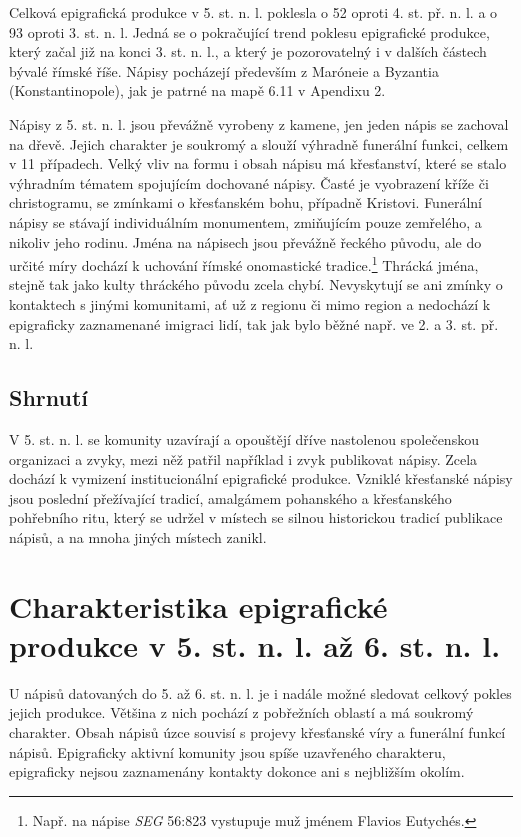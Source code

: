 \NC\AR
\HL
\HL
\stoptable

Celková epigrafická produkce v 5. st. n. l. poklesla o 52  oproti 4. st. př. n. l. a o 93  oproti 3. st. n. l. Jedná se o pokračující trend poklesu epigrafické produkce, který začal již na konci 3. st. n. l., a který je pozorovatelný i v dalších částech bývalé římské říše. Nápisy pocházejí především z Maróneie a Byzantia (Konstantinopole), jak je patrné na mapě 6.11 v Apendixu 2.

Nápisy z 5. st. n. l. jsou převážně vyrobeny z kamene, jen jeden nápis se zachoval na dřevě. Jejich charakter je soukromý a slouží výhradně funerální funkci, celkem v 11 případech. Velký vliv na formu i obsah nápisu má křesťanství, které se stalo výhradním tématem spojujícím dochované nápisy. Časté je vyobrazení kříže či christogramu, se zmínkami o křesťanském bohu, případně Kristovi. Funerální nápisy se stávají individuálním monumentem, zmiňujícím pouze zemřelého, a nikoliv jeho rodinu. Jména na nápisech jsou převážně řeckého původu, ale do určité míry dochází k uchování římské onomastické tradice.\footnote{Např. na nápise {\em SEG} 56:823 vystupuje muž jménem Flavios Eutychés.} Thrácká jména, stejně tak jako kulty thráckého původu zcela chybí. Nevyskytují se ani zmínky o kontaktech s jinými komunitami, ať už z regionu či mimo region a nedochází k epigraficky zaznamenané imigraci lidí, tak jak bylo běžné např. ve 2. a 3. st. př. n. l.

\subsection[shrnutí-23]{Shrnutí}

V 5. st. n. l. se komunity uzavírají a opouštějí dříve nastolenou společenskou organizaci a zvyky, mezi něž patřil například i zvyk publikovat nápisy. Zcela dochází k vymizení institucionální epigrafické produkce. Vzniklé křesťanské nápisy jsou poslední přežívající tradicí, amalgámem pohanského a křesťanského pohřebního ritu, který se udržel v místech se silnou historickou tradicí publikace nápisů, a na mnoha jiných místech zanikl.

\section[charakteristika-epigrafické-produkce-v-5.-st.-n.-l.-až-6.-st.-n.-l.]{Charakteristika epigrafické produkce v 5. st. n. l. až 6. st. n. l.}

U nápisů datovaných do 5. až 6. st. n. l. je i nadále možné sledovat celkový pokles jejich produkce. Většina z nich pochází z pobřežních oblastí a má soukromý charakter. Obsah nápisů úzce souvisí s projevy křesťanské víry a funerální funkcí nápisů. Epigraficky aktivní komunity jsou spíše uzavřeného charakteru, epigraficky nejsou zaznamenány kontakty dokonce ani s nejbližším okolím.

